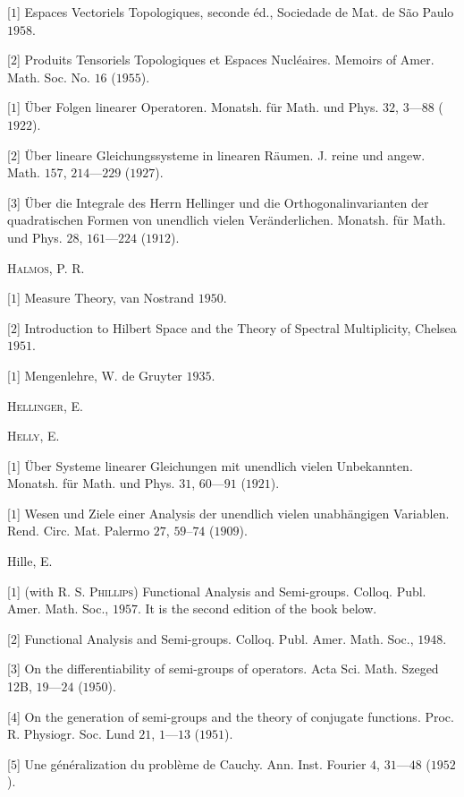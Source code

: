 [$1$] Espaces Vectoriels Topologiques, seconde éd., Sociedade de Mat. de São Paulo $1958$. 

[$2$] Produits Tensoriels Topologiques et Espaces Nucléaires. Memoirs of Amer. Math. Soc. No. $16$ ($1955$). 


[$1$] Über Folgen linearer Operatoren. Monatsh. für Math. und Phys. $32$, $3$---$88$ ($1922$). 

[$2$] Über lineare Gleichungssysteme in linearen Räumen. J. reine und angew. Math. $157$, $214$---$229$ ($1927$). 

[$3$] Über die Integrale des Herrn Hellinger und die Orthogonalinvarianten der quadratischen Formen von unendlich vielen Veränderlichen. Monatsh. für Math. und Phys. $28$, $161$---$224$ ($1912$). 

\textsc{Halmos}, P. R. 

[$1$] Measure Theory, van Nostrand $1950$. 

[$2$] Introduction to Hilbert Space and the Theory of Spectral Multiplicity, Chelsea $1951$. 

[$1$] Mengenlehre, W. de Gruyter $1935$. 

\textsc{Hellinger}, E. 

\textsc{Helly}, E. 

[$1$] Über Systeme linearer Gleichungen mit unendlich vielen Unbekannten. Monatsh. für Math. und Phys. $31$, $60$---$91$ ($1921$). 


[$1$] Wesen und Ziele einer Analysis der unendlich vielen unabhängigen Variablen. Rend. Circ. Mat. Palermo $27$, $59$--$74$ ($1909$). 

Hille, E. 

[$1$] (with R. S. \textsc{Phillips}) Functional Analysis and Semi-groups. Colloq. Publ. Amer. Math. Soc., $1957$. It is the second edition of the book below. 

[$2$] Functional Analysis and Semi-groups. Colloq. Publ. Amer. Math. Soc., $1948$. 

[$3$] On the differentiability of semi-groups of operators. Acta Sci. Math. Szeged 12B, $19$---$24$ ($1950$). 

[$4$] On the generation of semi-groups and the theory of conjugate functions. Proc. R. Physiogr. Soc. Lund $21$, $1$---$13$ ($1951$). 

[$5$] Une généralization du problème de Cauchy. Ann. Inst. Fourier $4$, $31$---$48$ ($1952$). 

